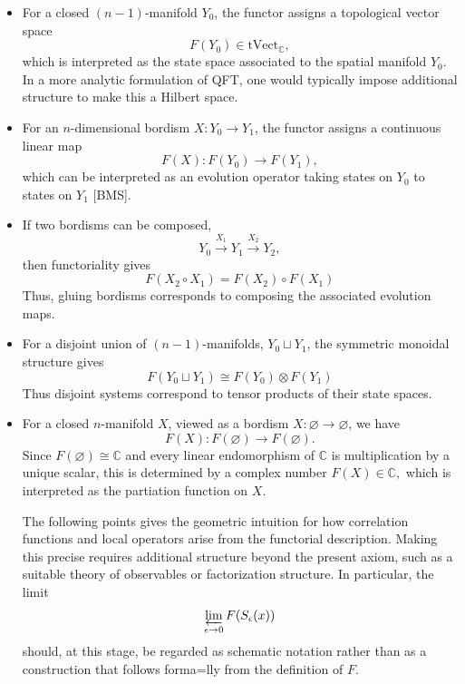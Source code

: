 \documentclass[a4paper,11pt]{article}
\begin{document}
\begin{itemize}
    \item For a closed $(n-1)$-manifold $Y_0$, the functor assigns a topological vector space
    \[
        F(Y_0)\in \mathrm{tVect}_{\mathbb{C}},
    \]
    which is interpreted as the state space associated to the spatial manifold $Y_0$. In a more analytic formulation of QFT, one would typically impose additional structure to make this a Hilbert space.

    \item For an $n$-dimensional bordism $X:Y_0\to Y_1$,
    the functor assigns a continuous linear map
    \[
        F(X):F(Y_0)\longrightarrow F(Y_1),
    \]
    which can be interpreted as an evolution operator taking states on $Y_0$ to states on $Y_1$ [BMS].

    \item If two bordisms can be composed, 
    \[
        Y_0 \xrightarrow{X_1} Y_1\xrightarrow{X_2}Y_2,
    \]
    then functoriality gives
    \[
        F(X_2 \circ X_1) = F(X_2) \circ F(X_1) 
    \]
    Thus, gluing bordisms corresponds to composing the associated evolution maps.

    \item For a disjoint union of $(n-1)$-manifolds, $Y_0 \sqcup Y_1$, the symmetric monoidal structure gives
    \[
        F(Y_0 \sqcup Y_1) \cong F(Y_0) \otimes F(Y_1)
    \]
    Thus disjoint systems correspond to tensor products of their state spaces. 

    \item For a closed $n$-manifold $X$, viewed as a bordism $X:\varnothing \to \varnothing$,
    we have 
    \[
        F(X):F(\varnothing)\longrightarrow F(\varnothing).
    \]
    Since $F(\varnothing)\cong\mathbb{C}$ and every linear endomorphism of $\mathbb C$ is multiplication by a unique scalar, this is determined by a complex number $F(X) \in \mathbb{C},$ which is interpreted as the partiation function on $X$.


    \begin{remark}
    The following points gives the geometric intuition for how correlation functions and local operators arise from the functorial
    description. Making this precise requires additional structure beyond the present axiom, such as a suitable theory of observables or factorization structure. In particular, the limit
    \[
        \varprojlim_{\epsilon\to0}F(S_\epsilon(x))
    \]
    should, at this stage, be regarded as schematic notation rather than as a construction that follows forma=lly from the definition of $F$.
\end{remark}



\end{itemize}
\end{document}
